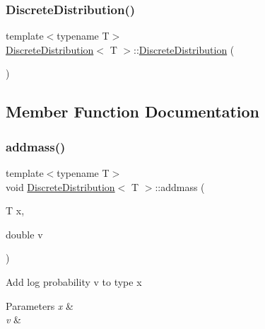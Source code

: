 \subsubsection{\texorpdfstring{Discrete\+Distribution()}{DiscreteDistribution()}}
{\footnotesize\ttfamily template$<$typename T$>$ \\
\hyperlink{class_discrete_distribution}{Discrete\+Distribution}$<$ T $>$\+::\hyperlink{class_discrete_distribution}{Discrete\+Distribution} (\begin{DoxyParamCaption}{ }\end{DoxyParamCaption})\hspace{0.3cm}{\ttfamily [inline]}}



\subsection{Member Function Documentation}
\mbox{\label{class_discrete_distribution_a6c41c7f4726019bc213d37d4e3cdea27}} 
\subsubsection{\texorpdfstring{addmass()}{addmass()}}
{\footnotesize\ttfamily template$<$typename T$>$ \\
void \hyperlink{class_discrete_distribution}{Discrete\+Distribution}$<$ T $>$\+::addmass (\begin{DoxyParamCaption}\item[{T}]{x,  }\item[{double}]{v }\end{DoxyParamCaption})\hspace{0.3cm}{\ttfamily [inline]}}

Add log probability v to type x 
\begin{DoxyParams}{Parameters}
{\em x} & \\
\hline
{\em v} & \\
\hline
\end{DoxyParams}
\mbox{\label{class_discrete_distribution_a7cf660223fe0f86b61e3b33268204c06}} 
